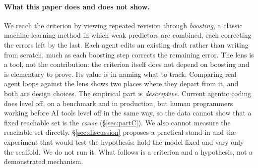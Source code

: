 \documentclass{article}
\theoremstyle{remark}
\theoremstyle{plain}
\begin{document}
\paragraph{What this paper does and does not show.} We reach the criterion by viewing repeated revision through \emph{boosting}, a classic machine-learning method in which weak predictors are combined, each correcting the errors left by the last. Each agent edits an existing draft rather than writing from scratch, much as each boosting step corrects the remaining error. The lens is a tool, not the contribution: the criterion itself does not depend on boosting and is elementary to prove. Its value is in naming what to track. Comparing real agent loops against the lens shows two places where they depart from it, and both are design choices. The empirical part is \emph{descriptive}. Current agentic coding does level off, on a benchmark and in production, but human programmers working before AI tools level off in the same way, so the data cannot show that a fixed reachable set is the \emph{cause} (\S\ref{sec:partC}). We also cannot measure the reachable set directly. \S\ref{sec:discussion} proposes a practical stand-in and the experiment that would test the hypothesis: hold the model fixed and vary only the scaffold. We do not run it. What follows is a criterion and a hypothesis, not a demonstrated mechanism.
\end{document}
